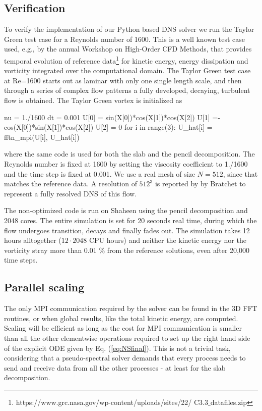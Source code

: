 \documentclass[11pt, oneside]{article}
\begin{document}
\subsection{Verification}
To verify the implementation of our Python based DNS solver we run the Taylor Green test case for a Reynolds number of 1600. This is a well known test case used, e.g., by the annual Workshop on High-Order CFD Methods, that provides temporal evolution of reference data\footnote{https://www.grc.nasa.gov/wp-content/uploads/sites/22/ C3.3$\_$datafiles.zip} for kinetic energy, energy dissipation and vorticity integrated over the computational domain. The Taylor Green test case at Re=1600 starts out as laminar with only one single length scale, and then through a series of complex flow patterns a fully developed, decaying, turbulent flow is obtained. The Taylor Green vortex is initialized as
\begin{python}
nu = 1./1600
dt = 0.001
U[0] = sin(X[0])*cos(X[1])*cos(X[2])
U[1] =-cos(X[0])*sin(X[1])*cos(X[2])
U[2] = 0 
for i in range(3):
    U_hat[i] = fftn_mpi(U[i], U_hat[i])
\end{python}
where the same code is used for both the slab and the pencil decomposition. The Reynolds number is fixed at 1600 by setting the viscosity coefficient to 1./1600 and the time step is fixed at 0.001. We use a real mesh of size $N=512$, since that matches the reference data. A resolution of $512^3$ is reported by by Bratchet \cite{brachet1991direct} to represent a fully resolved DNS of this flow. 

The non-optimized code is run on Shaheen using the pencil decomposition and 2048 cores. The entire simulation is set for 20 seconds real time, during which the flow undergoes transition, decays and finally fades out. The simulation takes 12 hours alltogether ($12\cdot2048$ CPU hours) and neither the kinetic energy nor the vorticity stray more than 0.01 \% from the reference solutions, even after 20,000 time steps.

\subsection{Parallel scaling}
The only MPI communication required by the solver can be found in the 3D 
FFT routines, or when global results, like the total kinetic energy, are 
computed. Scaling will be efficient as long as the cost for MPI 
communication is smaller than all the other elementwise operations required 
to set up the right hand side of the explicit ODE given by Eq. 
(\ref{eq:NSfinal}). This is not a trivial task, considering that a pseudo-spectral solver demands that every process needs to send and receive data 
from all the other processes - at least for the slab decomposition.
\end{document}
